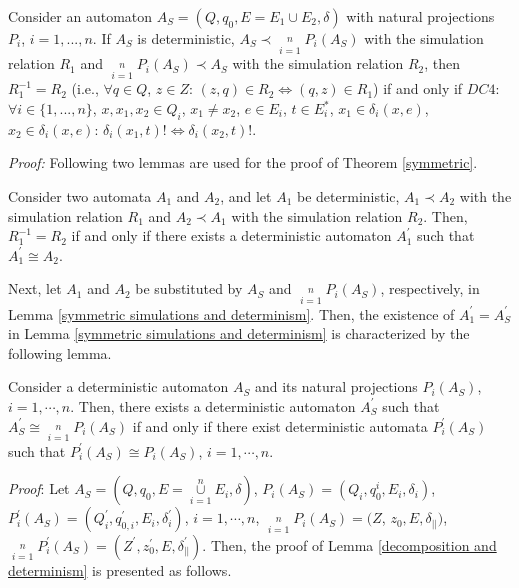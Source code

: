 \begin{theorem}\label{symmetric}
Consider an automaton $A_S=(Q, q_0, E=E_1\cup E_2, \delta)$ with
natural projections $P_i$, $i=1,...,n$. If $A_S$ is deterministic,
$A_S\prec \mathop {||}\limits_{i = 1}^n P_i \left( {A_S } \right)$
with the simulation relation $R_1$ and $\mathop {||}\limits_{i =
1}^n P_i \left( {A_S } \right)\prec A_S$ with the simulation
relation $R_2$, then $R^{-1}_1 = R_2$ (i.e., $\forall q\in Q$, $z\in
Z$: $(z, q)\in R_2 \Leftrightarrow (q, z)\in R_1$) if and only if
$DC4$: $\forall i\in\{1,...,n\}$, $x, x_1, x_2 \in Q_i$, $x_1\neq
x_2$, $e\in E_i$, $t\in E_i^*$, $x_1\in\delta_i (x, e)$,
$x_2\in\delta_i (x, e)$: $\delta_i (x_1, t)! \Leftrightarrow
\delta_i(x_2, t)!$.
\end{theorem}

\emph{Proof:} Following two lemmas are used for the proof of
Theorem \ref{symmetric}.
\begin{lemma}\label{symmetric simulations and
determinism} Consider two automata $A_1$ and $A_2$, and let $A_1$ be
deterministic, $A_1\prec A_2$ with the simulation relation $R_1$ and
$A_2\prec A_1$ with the simulation relation $R_2$. Then, $R_1^{-1} =
R_2$ if and only if there exists a deterministic automaton
$A^{\prime}_1$ such that $A_1^{\prime}\cong A_2$.
\end{lemma}
Next, let $A_1$ and $A_2$ be substituted by $A_S$ and $\mathop
{||}\limits_{i = 1}^n P_i(A_S)$, respectively, in Lemma
\ref{symmetric simulations and determinism}. Then, the existence of
$A_1^{\prime} = A_S^{\prime}$ in Lemma \ref{symmetric simulations
and determinism} is characterized by the following lemma.
\begin{lemma}\label{decomposition and determinism}
Consider a deterministic automaton $A_S$ and its natural projections
$P_i(A_S)$, $i = 1,\cdots, n$. Then, there exists a deterministic
automaton $A^{\prime}_S$ such that $A^{\prime}_S\cong \mathop
{||}\limits_{i = 1}^n P_i(A_S)$ if and only if there exist
deterministic automata $P_i^{\prime}(A_S)$ such that
$P_i^{\prime}(A_S) \cong P_i(A_S)$, $i = 1, \cdots, n$.
\end{lemma}

\emph{Proof}:
Let $A_S = (Q, q_0, E = \mathop {\cup}\limits_{i = 1}^n E_i,
\delta)$, $P_i(A_S) = (Q_i, q_0^i, E_i, \delta_i)$,
$P_i^{\prime}(A_S) = (Q_i^{\prime}, q_{0,i}^{\prime}, E_i,
\delta_i^{\prime})$, $i = 1, \cdots, n$, $\mathop {||}\limits_{i =
1}^n P_i(A_S) = (Z$, $z_0, E, \delta_{||})$, $\mathop {||}\limits_{i =
1}^n P_i^{\prime}(A_S) = (Z^{\prime}, z_0^{\prime}, E,
\delta_{||}^{\prime})$. Then, the proof of Lemma \ref{decomposition
and determinism} is presented as follows.

